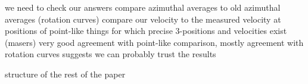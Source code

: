 we need to check our answers
compare azimuthal averages to old azimuthal averages (rotation curves)
compare our velocity to the measured velocity at positions of point-like things for which precise 3-positions and velocities exist (masers)
very good agreement with point-like comparison, mostly agreement with rotation curves suggests we can probably trust the results

structure of the rest of the paper